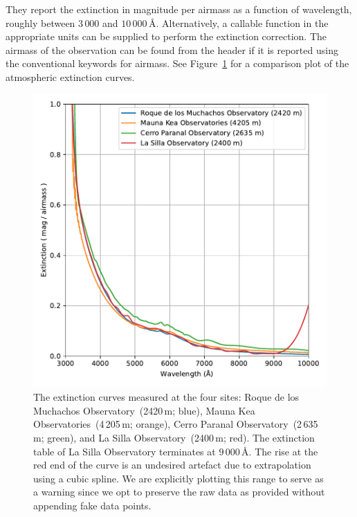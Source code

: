 \documentclass[linenumbers, twocolumn]{aastex631}
\begin{document}
They report the extinction in magnitude per airmass as a function of wavelength,
roughly between $3\,000$ and $10\,000$\,\AA. Alternatively, a callable function
in the appropriate units can be supplied to perform the extinction correction.
The airmass of the observation can be found from the header if it is reported
using the conventional keywords for airmass. See Figure~\ref{fig:extinction}
for a comparison plot of the atmospheric extinction curves.

\begin{figure}
    \centering
    \includegraphics[width=\columnwidth]{fig_07_extinction_curves.pdf}
    \caption{The extinction curves measured at the four sites: Roque de los
    Muchachos Observatory~(2420\,m; blue), Mauna Kea Observatories~(4\,205\,m;
    orange), Cerro Paranal Observatory~(2\,635\,m; green), and La Silla
    Observatory~(2400\,m; red). The extinction table of La Silla Observatory
    terminates at $9\,000$\,\AA. The rise at the red end of the curve is an
    undesired artefact due to extrapolation using a cubic spline. We are
    explicitly plotting this range to serve as a warning since we opt to
    preserve the raw data as provided without appending fake data points.}
    \label{fig:extinction}
\end{figure}

\end{document}
